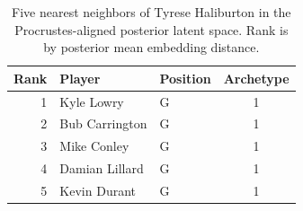 \begin{table}[htbp]
  \centering\small
  \begin{tabular}{rllc}
    \toprule
    Rank & Player & Position & Archetype \\
    \midrule
    1 & Kyle Lowry & G & 1 \\
    2 & Bub Carrington & G & 1 \\
    3 & Mike Conley & G & 1 \\
    4 & Damian Lillard & G & 1 \\
    5 & Kevin Durant & G & 1 \\
    \bottomrule
  \end{tabular}
  \caption{Five nearest neighbors of Tyrese Haliburton in the Procrustes-aligned posterior latent space. Rank is by posterior mean embedding distance.}
  \label{tab:Tyrese_Haliburton_neighbors}
\end{table}

